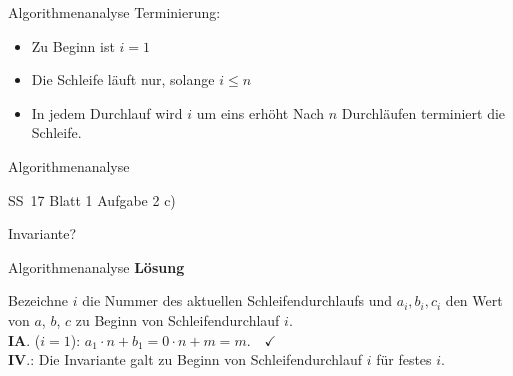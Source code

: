 \begin{frame}{Algorithmenanalyse}
	\solutionheading
	\Impl Terminierung:
	\begin{itemize}
		\item Zu Beginn ist $i = 1$
		\item Die Schleife läuft nur, solange $i \leq n$
		\item In jedem Durchlauf wird $i$ um eins erhöht
		\implitem Nach $n$ Durchläufen terminiert die Schleife.
	\end{itemize}
\end{frame}

\begin{frame}{Algorithmenanalyse}
	\begin{exampleblock}{SS~17 Blatt 1 Aufgabe 2 c)}
		\begin{algorithm}[H]
		\end{algorithm}
	\end{exampleblock}
	Invariante? \only<all:2>{Beweis?}
\end{frame}

\begin{frame}{Algorithmenanalyse}
	\textbf{Lösung} \\ 
		\begin{algorithm}[H] 
		\end{algorithm}
		
	Bezeichne $i$ die Nummer des aktuellen Schleifendurchlaufs und $a_i, b_i, c_i$ den Wert von $a$, $b$, $c$ zu Beginn von Schleifendurchlauf $i$. \\
	\pause
	\hanging \textbf{IA}. ($i=1$): \quad $a_1 \cdot n + b_1 = 0 \cdot n + m = m. \quad \checkmark$ \\
	\pause
	\hanging \textbf{IV}.: Die Invariante galt zu Beginn von Schleifendurchlauf $i$ für festes $i$. \\
	\pause
\end{frame}

